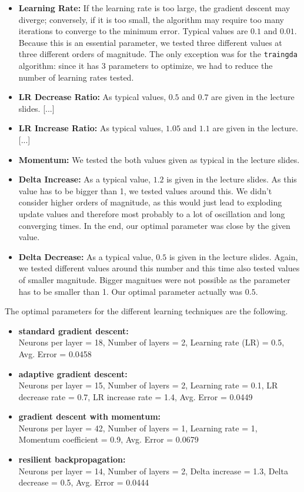 \documentclass{article}
\begin{document}
\begin{itemize}
\item \textbf{Learning Rate:} If the learning rate is too large, the gradient descent may diverge; conversely, if it is too small, the algorithm may require too many iterations to converge to the minimum error. Typical values are $0.1$ and $0.01$. Because this is an essential parameter, we tested three different values at three different orders of magnitude. The only exception was for the \verb$traingda$ algorithm: since it has 3 parameters to optimize, we had to reduce the number of learning rates tested.
\item \textbf{LR Decrease Ratio:} As typical values, $0.5$ and $0.7$ are given in the lecture slides. [...] %
\item \textbf{LR Increase Ratio:} As typical values, $1.05$ and $1.1$ are given in the lecture. [...] %
\item \textbf{Momentum:} We tested the both values given as typical in the lecture slides.
\item \textbf{Delta Increase:} As a typical value, $1.2$ is given in the lecture slides. As this value has to be bigger than 1, we tested values around this. We didn't consider higher orders of magnitude, as this would just lead to exploding update values and therefore most probably to a lot of oscillation and long converging times. In the end, our optimal parameter was close by the given value.
\item \textbf{Delta Decrease:} As a typical value, $0.5$ is given in the lecture slides. Again, we tested different values around this number and this time also tested values of smaller magnitude. Bigger magnitues were not possible as the parameter has to be smaller than 1. Our optimal parameter actually was $0.5$.
\end{itemize}
The optimal parameters for the different learning techniques are the following.
\begin{itemize}
\item \textbf{standard gradient descent:} \\ Neurons per layer = 18, Number of layers = 2, Learning rate (LR) = 0.5, Avg. Error = 0.0458
\item \textbf{adaptive gradient descent:}\\ Neurons per layer = 15, Number of layers = 2, Learning rate = 0.1, LR decrease rate = 0.7, LR increase rate = 1.4, Avg. Error = 0.0449
\item \textbf{gradient descent with momentum:}\\ Neurons per layer = 42, Number of layers = 1, Learning rate = 1, Momentum coefficient = 0.9, Avg. Error = 0.0679
\item \textbf{resilient backpropagation:}\\ Neurons per layer = 14, Number of layers = 2, Delta increase = 1.3, Delta decrease = 0.5, Avg. Error = 0.0444
\end{itemize}
\end{document}
